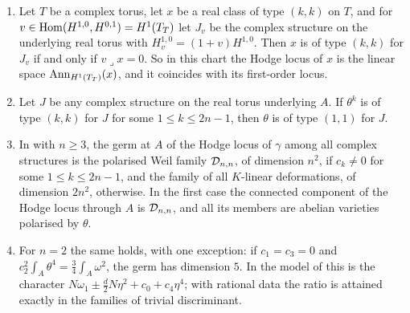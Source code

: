 \begin{proposition}
\label{prop:p2primelocus}
\begin{enumerate}[label=\textup{(\roman*)},leftmargin=2.6em,itemsep=2pt]
\item Let $T$ be a complex torus, let $x$ be a real class of type $(k,k)$ on
  $T$, and for $v\in\operatorname{Hom}(H^{1,0},H^{0,1})=H^{1}(T_{T})$ let $J_{v}$ be the
  complex structure on the underlying real torus with $H^{1,0}_{v}=(1+v)H^{1,0}$.
  Then $x$ is of type $(k,k)$ for $J_{v}$ if and only if $v\lrcorner x=0$. So
  in this chart the Hodge locus of $x$ is the linear space
  $\operatorname{Ann}_{H^{1}(T_{T})}(x)$, and it coincides with its first-order locus.
\item Let $J$ be any complex structure on the real torus underlying $A$. If
  $\theta^{k}$ is of type $(k,k)$ for $J$ for some $1\le k\le2n-1$, then
  $\theta$ is of type $(1,1)$ for $J$.
\item In  with $n\ge3$, the germ at $A$ of the Hodge locus
  of $\gamma$ among all complex structures is the polarised Weil family
  $\mathcal{D}_{n,n}$, of dimension $n^{2}$, if $c_{k}\ne0$ for some $1\le k\le2n-1$,
  and the family of all $K$-linear deformations, of dimension $2n^{2}$,
  otherwise. In the first case the connected component of the Hodge locus
  through $A$ is $\mathcal{D}_{n,n}$, and all its members are abelian varieties
  polarised by $\theta$.
\item For $n=2$ the same holds, with one exception: if $c_{1}=c_{3}=0$ and
  $c_{2}^{2}\int_{A}\theta^{4}=\tfrac34\int_{A}\omega^{2}$, the germ has
  dimension $5$. In the model of \cite[Setup~4.1]{paperI} this is
  the character $N\omega_{1}\pm\tfrac{d}{2}N\eta^{2}+c_{0}+c_{4}\eta^{4}$;
  with rational data the ratio is attained exactly in the families of trivial
  discriminant.
\end{enumerate}
\end{proposition}

